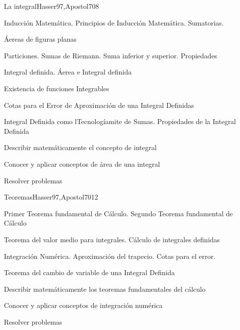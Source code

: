 \begin{syllabus}
\begin{unit}{La integral}{Hasser97,Apostol70}{8}
\begin{topics}
	\item Inducción Matemática. Principios de Inducción Matemática. Sumatorias.
	\item Áereas de figuras planas
	\item Particiones. Sumas de Riemann. Suma inferior y superior. Propiedades
	\item Integral definida. Áerea e Integral definida
	\item Existencia de funciones Integrables
	\item Cotas para el Error de Aproximación de una Integral Definidas
	\item Integral Definida como lTecnologíamite de Sumas. Propiedades de la Integral Definida
\end{topics}
\begin{unitgoals}
	\item Describir matemáticamente el concepto de integral
	\item Conocer y aplicar conceptos de área de una integral
	\item Resolver problemas
\end{unitgoals}
\end{unit}

\begin{unit}{Teoremas}{Hasser97,Apostol70}{12}
\begin{topics}
      \item Primer Teorema fundamental de Cálculo. Segundo Teorema fundamental de Cálculo
      \item Teorema del valor medio para integrales. Cálculo de integrales definidas
      \item Integración Numérica. Aproximación del trapecio. Cotas para el error.
      \item Teorema del cambio de variable de una Integral Definida
\end{topics}

   \begin{unitgoals}
      \item Describir matemáticamente los teoremas fundamentales del cálculo
      \item Conocer y aplicar conceptos de integración numérica
	\item Resolver problemas
   \end{unitgoals}
\end{unit}


\end{syllabus}

